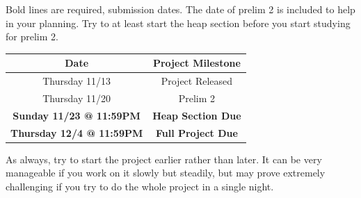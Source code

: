 \documentclass[11pt]{article}
\begin{document}
Bold lines are required, submission dates. The date of prelim 2 is included to help in your planning. Try to at least start the heap section before you start studying for prelim 2.\\

\begin{center}
\begin{Large}
\begin{tabular}{| c | c |}
\hline
Date & Project Milestone\\
\hline
Thursday 11/13 & Project Released\\
Thursday 11/20 & Prelim 2\\
\textbf{Sunday 11/23 @ 11:59PM} & \textbf{Heap Section Due}\\
\textbf{Thursday 12/4 @ 11:59PM} & \textbf{Full Project Due}\\
\hline
\end{tabular}
\end{Large}
\end{center}

As always, try to start the project earlier rather than later. It can be very manageable if you work on it slowly but steadily, but may prove extremely challenging if you try to do the whole project in a single night.
\end{document}
